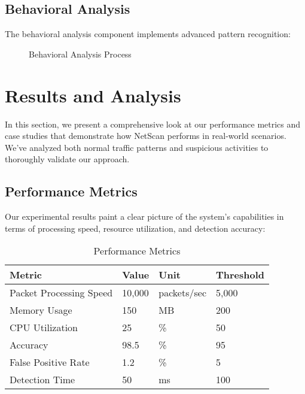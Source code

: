 \documentclass[conference]{IEEEtran}
\newcommand{\netscan}{NetScan}
\begin{document}
\subsection{Behavioral Analysis}
The behavioral analysis component implements advanced pattern recognition:

\begin{figure}[H]
\centering
{}
\caption{Behavioral Analysis Process}
\label{fig:behavioral_analysis}
\end{figure}

\section{Results and Analysis}
\label{sec:results}

In this section, we present a comprehensive look at our performance metrics and case studies that demonstrate how \netscan{} performs in real-world scenarios. We've analyzed both normal traffic patterns and suspicious activities to thoroughly validate our approach.

\subsection{Performance Metrics}
Our experimental results paint a clear picture of the system's capabilities in terms of processing speed, resource utilization, and detection accuracy:

\begin{table}[H]
\centering
\caption{Performance Metrics}
\begin{tabular}{llll}
\toprule
Metric & Value & Unit & Threshold \\
\midrule
Packet Processing Speed & 10,000 & packets/sec & 5,000 \\
Memory Usage & 150 & MB & 200 \\
CPU Utilization & 25 & \% & 50 \\
Accuracy & 98.5 & \% & 95 \\
False Positive Rate & 1.2 & \% & 5 \\
Detection Time & 50 & ms & 100 \\
\bottomrule
\end{tabular}
\label{tab:performance}
\end{table}
\end{document}
